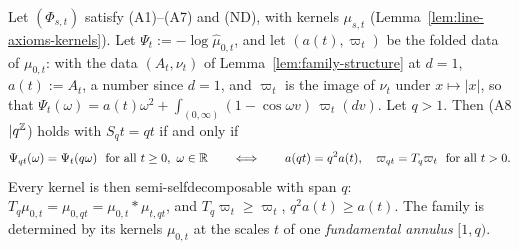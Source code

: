 \begin{lemma}
\label{lem:discrete-covariance-line}

Let $(\Phi_{s,t})$ satisfy (A1)--(A7) and (ND), with kernels $\mu_{s,t}$
(Lemma~\ref{lem:line-axioms-kernels}). Let $\Psi_t := -\log\widehat\mu_{0,t}$, and let
$(a(t), \varpi_t)$ be the folded data of $\mu_{0,t}$: with the \Levy{} data $(A_t, \nu_t)$ of
Lemma~\ref{lem:family-structure} at $d = 1$, $a(t) := A_t$, a number since $d = 1$, and
$\varpi_t$ is the image of $\nu_t$ under $x \mapsto |x|$, so that
$\Psi_t(\omega) = a(t)\omega^2 + \int_{(0,\infty)}(1 - \cos\omega v)\,\varpi_t(dv)$. Let $q > 1$.
Then (A8$|q^{\mathbb{Z}}$) holds with $S_qt = qt$ if and only if
\[
  \Psi_{qt}(\omega) = \Psi_t(q\omega) \ \text{ for all } t \ge 0,\ \omega \in \mathbb{R}
  \qquad\Longleftrightarrow\qquad
  a(qt) = q^2a(t), \quad \varpi_{qt} = T_q\varpi_t \ \text{ for all } t > 0 .
\]
Every kernel is then semi-selfdecomposable with span $q$: $T_q\mu_{0,t} = \mu_{0,qt} =
\mu_{0,t} * \mu_{t,qt}$, and $T_q\varpi_t \ge \varpi_t$, $q^2a(t) \ge a(t)$. The family is
determined by its kernels $\mu_{0,t}$ at the scales $t$ of one \emph{fundamental annulus}
$[1, q)$.
\end{lemma}

